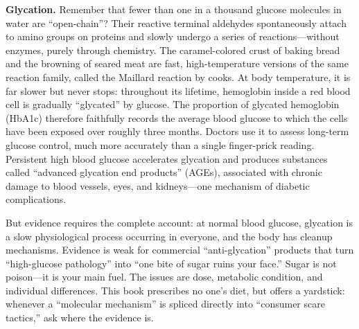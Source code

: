 \textbf{Glycation.} Remember that fewer than one in a thousand glucose molecules in water are ``open-chain''? Their reactive terminal aldehydes spontaneously attach to amino groups on proteins and slowly undergo a series of reactions---without enzymes, purely through chemistry. The caramel-colored crust of baking bread and the browning of seared meat are fast, high-temperature versions of the same reaction family, called the Maillard reaction by cooks. At body temperature, it is far slower but never stops: throughout its lifetime, hemoglobin inside a red blood cell is gradually ``glycated'' by glucose. The proportion of glycated hemoglobin (HbA1c) therefore faithfully records the average blood glucose to which the cells have been exposed over roughly three months. Doctors use it to assess long-term glucose control, much more accurately than a single finger-prick reading. Persistent high blood glucose accelerates glycation and produces substances called ``advanced glycation end products'' (AGEs), associated with chronic damage to blood vessels, eyes, and kidneys---one mechanism of diabetic complications.

But evidence requires the complete account: at normal blood glucose, glycation is a slow physiological process occurring in everyone, and the body has cleanup mechanisms. Evidence is weak for commercial ``anti-glycation'' products that turn ``high-glucose pathology'' into ``one bite of sugar ruins your face.'' Sugar is not poison---it is your main fuel. The issues are dose, metabolic condition, and individual differences. This book prescribes no one's diet, but offers a yardstick: whenever a ``molecular mechanism'' is spliced directly into ``consumer scare tactics,'' ask where the evidence is.


